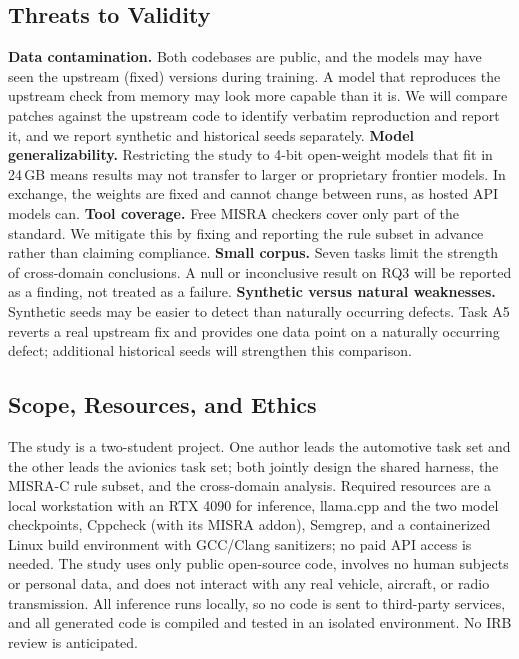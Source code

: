 \documentclass[12pt]{IEEEtran}
\begin{document}
\subsection{Threats to Validity}
\textbf{Data contamination.} Both codebases are public, and the models may have seen the upstream (fixed) versions during training. A model that reproduces the upstream check from memory may look more capable than it is. We will compare patches against the upstream code to identify verbatim reproduction and report it, and we report synthetic and historical seeds separately.
\textbf{Model generalizability.} Restricting the study to 4-bit open-weight models that fit in 24\,GB means results may not transfer to larger or proprietary frontier models. In exchange, the weights are fixed and cannot change between runs, as hosted API models can.
\textbf{Tool coverage.} Free MISRA checkers cover only part of the standard. We mitigate this by fixing and reporting the rule subset in advance rather than claiming compliance.
\textbf{Small corpus.} Seven tasks limit the strength of cross-domain conclusions. A null or inconclusive result on RQ3 will be reported as a finding, not treated as a failure.
\textbf{Synthetic versus natural weaknesses.} Synthetic seeds may be easier to detect than naturally occurring defects. Task A5 reverts a real upstream fix and provides one data point on a naturally occurring defect; additional historical seeds will strengthen this comparison.

\subsection{Scope, Resources, and Ethics}
The study is a two-student project. One author leads the automotive task set and the other leads the avionics task set; both jointly design the shared harness, the MISRA-C rule subset, and the cross-domain analysis. Required resources are a local workstation with an RTX 4090 for inference, llama.cpp and the two model checkpoints, Cppcheck (with its MISRA addon), Semgrep, and a containerized Linux build environment with GCC/Clang sanitizers; no paid API access is needed. The study uses only public open-source code, involves no human subjects or personal data, and does not interact with any real vehicle, aircraft, or radio transmission. All inference runs locally, so no code is sent to third-party services, and all generated code is compiled and tested in an isolated environment. No IRB review is anticipated.
\end{document}
